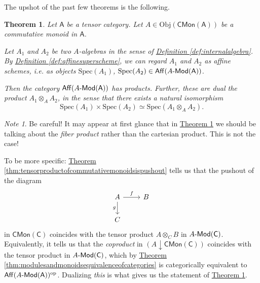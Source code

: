 \documentclass[a4paper]{report}
\newcommand{\Obj}{\mathrm{Obj}}
\newcommand{\Spec}{\mathrm{Spec}}
\def\mhyp{{\hbox{-}}}
\theoremstyle{definition}
\theoremstyle{plain}
\newtheorem{theorem}{Theorem}[section]
\theoremstyle{remark}
\newtheorem{note}{Note}[section]
\begin{document}
The upshot of the past few theorems is the following.
\begin{theorem}
  \label{thm:quasiffinevarietieshaveproducts}
  Let $\mathsf{A}$ be a tensor category. Let $A \in \Obj(\mathsf{CMon}(\mathsf{A}))$ be a commutative monoid in $\mathsf{A}$.

  Let $A_{1}$ and $A_{2}$ be two $A$-algebras in the sense of \hyperref[def:internalalgebra]{Definition \ref*{def:internalalgebra}}. By \hyperref[def:affinesuperscheme]{Definition \ref*{def:affinesuperscheme}}, we can regard $A_{1}$ and $A_{2}$ as affine schemes, i.e. as objects $\Spec(A_{1})$, $\Spec(A_{2}) \in \mathsf{Aff}(A\mhyp\mathsf{Mod}(\mathsf{A}))$.

  Then the category $\mathsf{Aff}(A\mhyp\mathsf{Mod}(\mathsf{A}))$ has products. Further, these are dual the product $A_{1} \otimes_{A} A_{2}$, in the sense that there exists a natural isomorphism
  \begin{equation*}
    \Spec(A_{1}) \times \Spec(A_{2}) \simeq \Spec(A_{1} \otimes_{A} A_{2}).
  \end{equation*}
\end{theorem} 

\begin{note}
  Be careful! It may appear at first glance that in \hyperref[thm:quasiffinevarietieshaveproducts]{Theorem \ref*{thm:quasiffinevarietieshaveproducts}} we should be talking about the \emph{fiber product} rather than the cartesian product. This is not the case! 

  To be more specific: \hyperref[thm:tensorproductofcommutativemonoidsispushout]{Theorem \ref*{thm:tensorproductofcommutativemonoidsispushout}} tells us that the pushout of the diagram 
  \begin{equation*}
    \begin{tikzcd}
      A
      \arrow[r, "f"]
      \arrow[d, swap, "g"]
      & B
      \\
      C
    \end{tikzcd}
  \end{equation*}
  in $\mathsf{CMon}(\mathsf{C})$ coincides with the tensor product $A \otimes_{C} B$ in $A\mhyp\mathsf{Mod}(\mathsf{C})$. Equivalently, it tells us that the \emph{coproduct} in $(A \downarrow\mathsf{CMon}(\mathsf{C}))$ coincides with the tensor product in $A\mhyp\mathsf{Mod}(\mathsf{C})$, which by \hyperref[thm:modulesandmonoidsequivalenceofcategories]{Theorem \ref*{thm:modulesandmonoidsequivalenceofcategories}} is categorically equivalent to $\mathsf{Aff}(A\mhyp\mathsf{Mod}(\mathsf{A}))^{\mathrm{op}}$. Dualizing \emph{this} is what gives us the statement of \hyperref[thm:quasiffinevarietieshaveproducts]{Theorem \ref*{thm:quasiffinevarietieshaveproducts}}.
\end{note}
\end{document}
